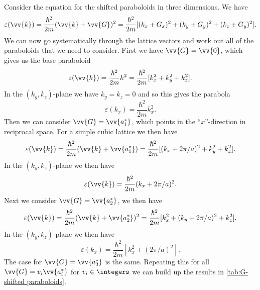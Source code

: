 \documentclass[fleqn]{NotesClass}
\begin{document}
    Consider the equation for the shifted paraboloids in three dimensions.
    We have
    \begin{equation}
        \varepsilon(\vv{k}) = \frac{\hbar^2}{2m}(\vv{k} + \vv{G})^2 = \frac{\hbar^2}{2m}[(k_x + G_x)^2 + (k_y + G_y)^2 + (k_z + G_y)^2].
    \end{equation}
    We can now go systematically through the lattice vectors and work out all of the paraboloids that we need to consider.
    First we have \(\vv{G} = \vv{0}\), which gives us the base paraboloid
    \begin{equation}
        \varepsilon(\vv{k}) = \frac{\hbar^2}{2m}k^2 = \frac{\hbar^2}{2m}[k_x^2 + k_y^2 + k_z^2].
    \end{equation}
    In the \((k_y, k_z)\)-plane we have \(k_y = k_z = 0\) and so this gives the parabola
    \begin{equation}
        \varepsilon(k_x) = \frac{\hbar^2}{2m}k_x^2.
    \end{equation}
    Then we can consider \(\vv{G} = \vv{a_1^*}\), which points in the \enquote{\(x\)}-direction in reciprocal space.
    For a simple cubic lattice we then have
    \begin{equation}
        \varepsilon(\vv{k}) = \frac{\hbar^2}{2m}(\vv{k} + \vv{a_1^*}) = \frac{\hbar^2}{2m}[(k_x + 2\pi/a)^2 + k_y^2 + k_z^2].
    \end{equation}
    In the \((k_y, k_z)\)-plane we then have
    \begin{equation}
        \varepsilon(\vv{k}) = \frac{\hbar^2}{2m}(k_x + 2\pi/a)^2.
    \end{equation}
    Next we consider \(\vv{G} = \vv{a_2^*}\), we then have
    \begin{equation}
        \varepsilon(\vv{k}) = \frac{\hbar^2}{2m}(\vv{k} + \vv{a_2^*})^2 = \frac{\hbar^2}{2m}[k_x^2 + (k_y + 2\pi/a)^2 + k_z^2].
    \end{equation}
    In the \((k_y, k_z)\)-plane we then have
    \begin{equation}
        \varepsilon(k_x) = \frac{\hbar^2}{2m}[k_x^2 + (2\pi/a)^2].
    \end{equation}
    The case for \(\vv{G} = \vv{a_3^*}\) is the same.
    Repeating this for all \(\vv{G} = v_i\vv{a_i^*}\) for \(v_i\in\integers\) we can build up the results in \cref{tab:G-shifted paraboloids}.
    
\end{document}
